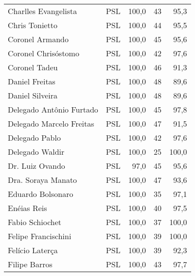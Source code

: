 \begin{longtable}{llrrr}
                Charlles Evangelista &            PSL &     100,0 &           43 &       95,3 \\
                      Chris Tonietto &            PSL &     100,0 &           44 &       95,5 \\
                     Coronel Armando &            PSL &     100,0 &           45 &       95,6 \\
                 Coronel Chrisóstomo &            PSL &     100,0 &           42 &       97,6 \\
                       Coronel Tadeu &            PSL &     100,0 &           46 &       91,3 \\
                      Daniel Freitas &            PSL &     100,0 &           48 &       89,6 \\
                     Daniel Silveira &            PSL &     100,0 &           48 &       89,6 \\
            Delegado Antônio Furtado &            PSL &     100,0 &           45 &       97,8 \\
            Delegado Marcelo Freitas &            PSL &     100,0 &           47 &       91,5 \\
                      Delegado Pablo &            PSL &     100,0 &           42 &       97,6 \\
                     Delegado Waldir &            PSL &     100,0 &           25 &      100,0 \\
                     Dr. Luiz Ovando &            PSL &      97,0 &           45 &       95,6 \\
                  Dra. Soraya Manato &            PSL &     100,0 &           47 &       93,6 \\
                   Eduardo Bolsonaro &            PSL &     100,0 &           35 &       97,1 \\
                         Enéias Reis &            PSL &     100,0 &           40 &       97,5 \\
                     Fabio Schiochet &            PSL &     100,0 &           37 &      100,0 \\
                 Felipe Francischini &            PSL &     100,0 &           39 &      100,0 \\
                     Felício Laterça &            PSL &     100,0 &           39 &       92,3 \\
                       Filipe Barros &            PSL &     100,0 &           43 &       97,7 \\

\end{longtable}
